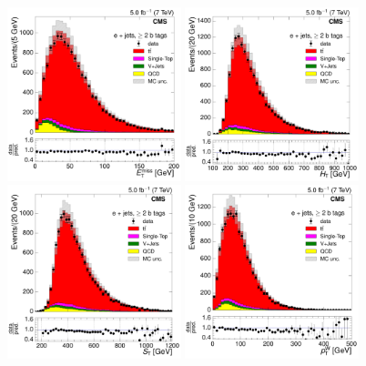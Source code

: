 \begin{figure}[hbtp]
    \centering
     \includegraphics[width=0.45\textwidth]{Chapters/07_08_09_Analysis/Images/control_plots/before_fit/7TeV/EPlusJets_patType1CorrectedPFMet_2orMoreBtags_with_ratio}\hfill
     \includegraphics[width=0.45\textwidth]{Chapters/07_08_09_Analysis/Images/control_plots/before_fit/7TeV/EPlusJets_HT_2orMoreBtags_with_ratio}\\
     \includegraphics[width=0.45\textwidth]{Chapters/07_08_09_Analysis/Images/control_plots/before_fit/7TeV/EPlusJets_patType1CorrectedPFMet_ST_2orMoreBtags_with_ratio}\hfill
     \includegraphics[width=0.45\textwidth]{Chapters/07_08_09_Analysis/Images/control_plots/before_fit/7TeV/EPlusJets_patType1CorrectedPFMet_WPT_2orMoreBtags_with_ratio}\\

\end{figure}

